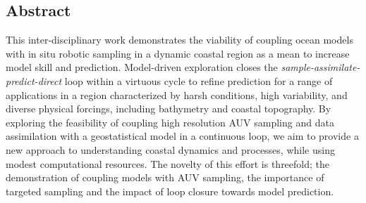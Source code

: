 \subsection{Abstract}

This inter-disciplinary work demonstrates the viability of coupling
ocean models with in situ robotic sampling in a dynamic coastal region
as a mean to increase model skill and prediction. Model-driven
exploration closes the \emph{sample-assimilate-predict-direct} loop
within a virtuous cycle to refine prediction for a range of
applications in a region characterized by harsh conditions, high
variability, and diverse physical forcings, including bathymetry and
coastal topography.  By exploring the feasibility of coupling high
resolution AUV sampling and data assimilation with a geostatistical
model in a continuous loop, we aim to provide a new approach to
understanding coastal dynamics and processes, while using modest
computational resources. The novelty of this effort is
  threefold; the demonstration of coupling models with AUV sampling,
  the importance of targeted sampling and the impact of loop closure
  towards model prediction.
